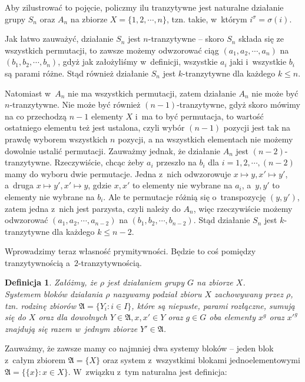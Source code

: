 \documentclass[licencjacka]{pracamgr}
\newtheorem{deff}{Definicja}[section]
\begin{document}
Aby zilustrować to pojęcie, policzmy ilu tranzytywne jest naturalne działanie grupy $S_n$ oraz $A_n$ na zbiorze $X = \{1, 2, \cdots, n\}$,
tzn. takie, w~którym $i^\sigma = \sigma(i)$.

Jak łatwo zauważyć, działanie $S_n$ jest $n$-tranzytywne -- skoro $S_n$ składa się ze wszystkich permutacji, 
to zawsze możemy odwzorować ciąg $(a_1, a_2, \cdots, a_n)$ na $(b_1, b_2, \cdots, b_n)$, gdyż jak założyliśmy w~definicji, 
wszystkie $a_i$ jaki i~wszystkie $b_i$ są parami różne.
Stąd również działanie $S_n$ jest $k$-tranzytywne dla każdego $k \le n$.

Natomiast w~$A_n$ nie ma wszystkich permutacji, zatem działanie $A_n$ nie może być $n$-tranzytywne.
Nie może być również $(n-1)$-tranzytywne, gdyż skoro mówimy na co przechodzą $n-1$ elementy $X$ i~ma to być permutacja,
to wartość ostatniego elementu też jest ustalona, czyli wybór $(n-1)$ pozycji jest tak na prawdę wyborem wszystkich $n$ pozycji, 
a na wszystkich elementach nie możemy dowolnie ustalić permutacji.
Zauważmy jednak, że działanie $A_n$ jest $(n-2)$-tranzytywne. 
Rzeczywiście, chcąc żeby $a_i$ przeszło na $b_i$ dla $i = 1, 2, \cdots, (n-2)$ mamy do wyboru dwie permutacje.
Jedna z~nich odwzorowuje $x \mapsto y, x' \mapsto y'$, a~druga $x \mapsto y', x' \mapsto y$, 
gdzie $x, x'$ to elementy nie wybrane na $a_i$, a~$y, y'$ to elementy nie wybrane na $b_i$. 
Ale te permutacje różnią się o~transpozycję $(y, y')$, zatem jedna z~nich jest parzysta, czyli należy do $A_n$,
więc rzeczywiście możemy odwzorować $(a_1, a_2, \cdots, a_{n-2})$ na $(b_1, b_2, \cdots, b_{n-2})$.
Stąd działanie $S_n$ jest $k$-tranzytywne dla każdego $k \le n-2$.

Wprowadzimy teraz własność prymitywności. 
Będzie to coś pomiędzy tranzytywnością a~$2$-tranzytywnością.

\begin{deff}
	Załóżmy, że $\rho$ jest działaniem grupy $G$ na zbiorze $X$. \\
	\emph{Systemem bloków} działania $\rho$ nazywamy podział zbioru $X$ zachowywany przez $\rho$,
	tzn. rodzinę zbiorów $\mathfrak{A} = \{Y_i \colon i \in I \}$, które są niepuste, parami rozłączne, sumują się do $X$ 
	oraz dla dowolnych $Y \in \mathfrak{A}, x, x' \in Y$ oraz $g \in G$ 
	oba elementy $x^g$ oraz $x'^g$ znajdują się razem w~jednym zbiorze $Y' \in \mathfrak{A}$.
\end{deff}

Zauważmy, że zawsze mamy co najmniej dwa systemy bloków -- jeden blok z~całym zbiorem $\mathfrak{A} = \{X\}$
oraz system z~wszystkimi blokami jednoelementowymi $\mathfrak{A} = \{\{x\} \colon x \in X\}$.
W~związku z~tym naturalna jest definicja:
\end{document}
